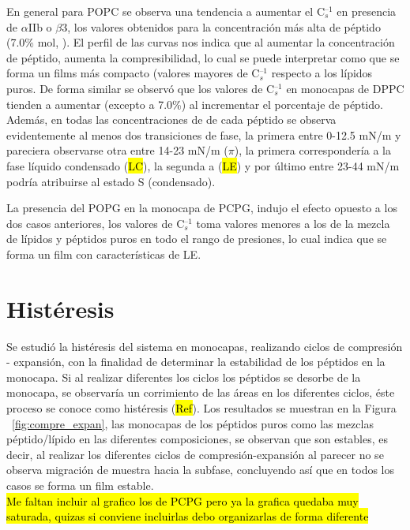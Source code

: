 {En general para POPC se observa una tendencia a aumentar el C$_s^{\text{--}1}$ en presencia de $\alpha$IIb  o $\beta$3, los valores obtenidos para la concentración más alta de péptido (7.0\% mol, \textcolor{deepmagenta}{\faSquare}). El perfil de las curvas nos indica que al aumentar la concentración de péptido, aumenta la compresibilidad, lo cual se puede interpretar como que se forma un films más compacto (valores mayores de C$_s^{\text{--}1}$ respecto  a los lípidos puros. De forma similar se observó que los valores de C$_s^{\text{--}1}$ en monocapas de DPPC tienden a aumentar (excepto a 7.0\%) al incrementar el porcentaje de péptido. Además, en todas las concentraciones de de cada péptido se observa evidentemente al menos dos transiciones de fase, la primera entre 0-12.5 mN/m y pareciera observarse otra entre 14-23 mN/m ($\pi$), la primera correspondería a la fase líquido condensado (\hl{LC}), la segunda a (\hl{LE}) y por último entre 23-44 mN/m podría atribuirse al estado S (condensado).

La presencia del POPG en la monocapa de PCPG, indujo el efecto opuesto a los dos casos anteriores, los valores de C$_s^{\text{--}1}$ toma valores menores a los de la mezcla de lípidos y péptidos puros en todo el rango de presiones, lo cual indica que se forma un film con características de LE.

\section{Histéresis}

Se estudió la histéresis del sistema en monocapas, realizando ciclos de compresión - expansión, con la finalidad de determinar la estabilidad de los péptidos en la monocapa. Si al realizar diferentes los ciclos los péptidos se desorbe de la monocapa, se observaría un corrimiento de las áreas en los diferentes ciclos, éste proceso se conoce como histéresis  (\hl{Ref}).  Los resultados se muestran en la Figura ~\ref{fig:compre_expan}, las monocapas de los péptidos puros como las mezclas péptido/lípido en las diferentes composiciones, se observan que son estables, es decir, al realizar los diferentes ciclos de compresión-expansión al parecer no se observa migración de muestra hacia la subfase, concluyendo así que en todos los casos se forma un film estable.\\
\hl{Me faltan incluir al grafico los de PCPG pero ya la grafica quedaba muy saturada, quizas si conviene incluirlas debo organizarlas de forma diferente}

}
